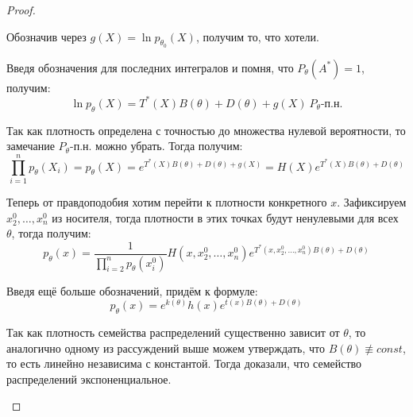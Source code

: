 \begin{proof}
\begin{itemize}
        Обозначив через $g(X) = \ln p_{\theta_0}(X)$, получим то, что хотели.

        \color{black}
        Введя обозначения для последних интегралов и помня, что $P_\theta(A^*) = 1$, получим:
        \[
            \ln p_\theta(X) = T^*(X) B(\theta) + D(\theta) + g(X) \ P_\theta \text{-п.н.}
        \]

        Так как плотность определена с точностью до множества нулевой вероятности, то замечание $P_\theta \text{-п.н.}$ можно убрать. Тогда получим:
        \[
            \prod_{i=1}^n p_\theta(X_i) = p_\theta(X) = e^{T^*(X) B(\theta) + D(\theta) + g(X)} = H(X) e^{T^*(X) B(\theta) + D(\theta)}
        \]

        Теперь от правдоподобия хотим перейти к плотности конкретного $x$. Зафиксируем $x_2^0, \dots, x_n^0$ из носителя, тогда плотности в этих точках будут ненулевыми для всех $\theta$, тогда получим:
        \[
            p_\theta(x) = \frac{1}{\prod_{i=2}^n p_\theta(x_i^0)} H(x, x_2^0, \dots, x_n^0) e^{T^*(x, x_2^0, \dots, x_n^0) B(\theta) + D(\theta)}
        \]

        Введя ещё больше обозначений, придём к формуле:
        \[
            p_\theta(x) = e^{k(\theta)} h(x) e^{t(x) B(\theta) + D(\theta)}
        \]

        Так как плотность семейства распределений существенно зависит от $\theta$, то аналогично одному из рассуждений выше можем утверждать, что $B(\theta) \not\equiv const$, то есть линейно независима с константой. Тогда доказали, что семейство распределений экспоненциальное.
    \end{itemize}
\end{proof}